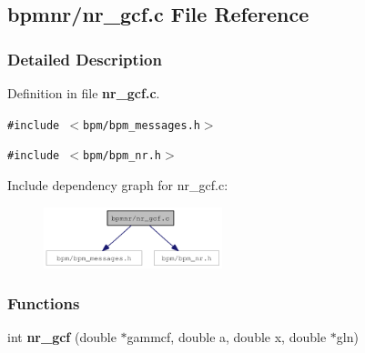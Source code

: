 \subsection{bpmnr/nr\_\-gcf.c File Reference}
\label{nr__gcf_8c}


\subsubsection{Detailed Description}


Definition in file {\bf nr\_\-gcf.c}.

{\tt \#include $<$bpm/bpm\_\-messages.h$>$}\par
{\tt \#include $<$bpm/bpm\_\-nr.h$>$}\par


Include dependency graph for nr\_\-gcf.c:\nopagebreak
\begin{figure}[H]
\begin{center}
\leavevmode
\includegraphics[width=147pt]{nr__gcf_8c__incl}
\end{center}
\end{figure}
\subsubsection*{Functions}
\begin{CompactItemize}
\item 
int {\bf nr\_\-gcf} (double $\ast$gammcf, double a, double x, double $\ast$gln)
\end{CompactItemize}
